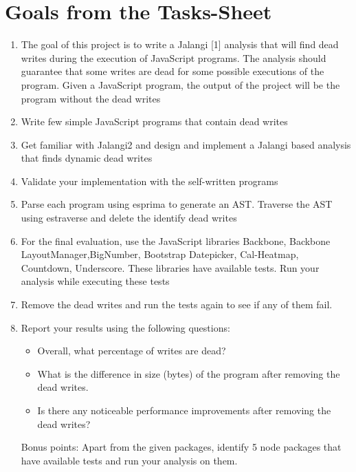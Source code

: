 \documentclass[a4paper]{scrartcl}
\begin{document}
\section{Goals from the Tasks-Sheet}
\begin{enumerate}
\item The goal of this project is to write a Jalangi [1] analysis that will find dead writes during the execution of JavaScript programs. The analysis should guarantee that some writes are dead for some possible
executions of the program. Given a JavaScript program, the output of the project will be the program without the dead writes
\item Write few simple JavaScript programs that contain dead writes 
\item Get familiar with Jalangi2 and design and implement a Jalangi based analysis that finds dynamic dead writes
\item Validate your implementation with the self-written programs
\item Parse each program using esprima to generate an AST. Traverse the AST using estraverse and
delete the identify dead writes
\item For the final evaluation, use the JavaScript libraries Backbone, Backbone LayoutManager,BigNumber, Bootstrap Datepicker, Cal-Heatmap, Countdown,
Underscore. These libraries have available tests. Run your analysis while executing these tests
\item Remove the dead writes and run the tests again to see if any of them fail.
\item Report your results using the following questions:
\begin{itemize}
      \item{Overall, what percentage of writes are dead?}
      \item{What is the difference in size (bytes) of the program after removing the dead writes.}
      \item{Is there any noticeable performance improvements after removing the dead writes?}
    \end{itemize}
Bonus points: Apart from the given packages, identify 5 node packages that have available
tests and run your analysis on them.
\end{enumerate}
\newpage
\end{document}
